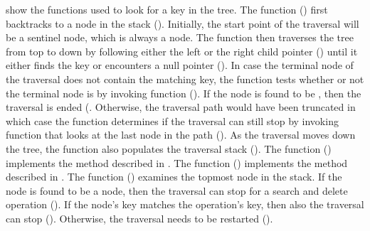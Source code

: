  show the functions used to look for a key in the tree.
The function \SeekForTarget{} () first backtracks to a \mysafe{} node in the stack ().
Initially, the start point of the traversal will be a sentinel node, which is always a \mysafe{} node.
The function then traverses the tree from top to down by following either the left or the right child pointer () until it either finds the key or encounters a null pointer ().
In case the terminal node of the traversal does not contain the matching key, the function tests whether or not the terminal node is \mysafe{} by invoking  \FindAdmissible{} function ().
If the node is found to be \mysafe{}, then the traversal is ended (.
Otherwise, the traversal path would have been truncated in which case the function determines if the traversal can still stop by invoking \ExamineTop{} function that looks at the last node in the path (). 
As the traversal moves down the tree, the function also populates the traversal stack ().
The function \FindAdmissible{} () implements the method described in .
The function \FindStartPoint{} () implements the method described in .
The function \ExamineTop{} () examines the topmost node in the stack. If the node is found to be a \myinconsistent{} node, then the traversal can stop for a search and delete operation ().
If the node's key matches the operation's key, then also the traversal can stop ().
Otherwise, the traversal needs to be restarted ().

